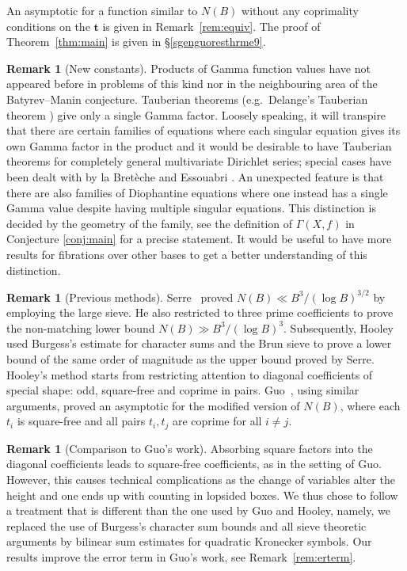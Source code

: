 \documentclass[a4paper,12pt,reqno]{amsart}
\numberwithin{equation}{section} \numberwithin{figure}{section}
\renewcommand{\b}{\mathbf}
\renewcommand{\#}{\sharp}
\theoremstyle{definition}
\newtheorem{remark}[lemma]{Remark}
\numberwithin{lemma}{section}
\begin{document}
An asymptotic for a function similar to $N(B)$ without any coprimality conditions on the $\b t $ is given in Remark~\ref{rem:equiv}.
The proof of Theorem~\ref{thm:main} is given in \S\ref{sgenguoresthrme9}.
\begin{remark}
[New constants]
Products of Gamma function values have not appeared before in 
problems of this kind nor in the neighbouring area of the Batyrev--Manin conjecture.
Tauberian theorems (e.g.~Delange's Tauberian theorem \cite{Del54}) give only a single Gamma factor.  
Loosely speaking,
it will transpire that
there are  certain families of equations
where 
each singular equation gives its own Gamma factor in the product and it would be desirable to
have Tauberian theorems
for completely general  multivariate Dirichlet series; special cases have been dealt with by
la Bret\`eche \cite{MR1858338}
and Essouabri \cite{MR1450422}. 
An unexpected feature is that 
there are also families of Diophantine equations 
where 
one instead 
has  a single Gamma value despite having multiple singular equations.
This distinction  
is decided by the geometry of the family, see the definition of $\Gamma(X, f) $ 
in Conjecture \ref{conj:main}
for a precise statement. It would be useful to have more results for fibrations over other bases to get a better understanding of this distinction.
 \end{remark}
  \begin{remark}
[Previous methods]
Serre~\cite{Ser90} proved  
  $N(B) \ll  B^3/(\log B)^{3/2}$ by employing 
  the large sieve.
He also restricted to three  prime coefficients to prove the non-matching
 lower bound
$N(B) \gg  B^3/(\log B)^{3}$.
Subsequently, Hooley~\cite{Hoo93} 
used  Burgess's estimate for  character sums and the Brun sieve
to   prove a lower bound of the same order of magnitude as the upper bound proved by Serre.
  Hooley's method starts      from restricting attention to diagonal coefficients of special shape: odd, square-free and coprime in pairs. 
Guo~\cite{Guo95}, using  similar arguments, proved  an asymptotic for the modified version of   $N(B)$, where 
each $t_i$ is square-free and all pairs $t_i, t_j$ are coprime for all $i\neq j $.  
\end{remark}

\begin{remark}
[Comparison to Guo's work]
Absorbing square factors into the diagonal coefficients 
leads to  square-free coefficients, as in the setting of 
  Guo. However, this causes  
technical complications as the change of variables 
alter the height and one ends up with counting in lopsided boxes.
We thus chose to  follow a treatment that is different than the one used by Guo and Hooley, namely,
we  replaced
 the use of Burgess's character sum bounds
and all sieve theoretic arguments  by    bilinear  sum estimates for quadratic Kronecker symbols.
Our results improve the error term in 
 Guo's work, see Remark~\ref{rem:erterm}.
\end{remark}
\end{document}
